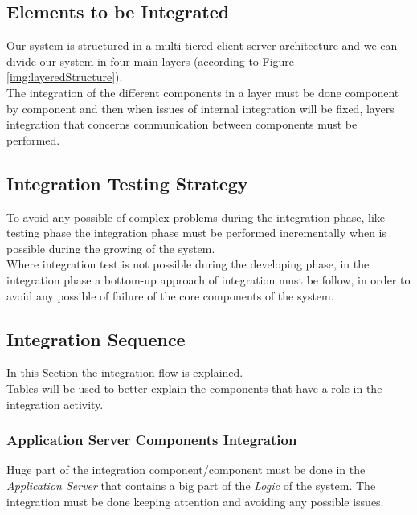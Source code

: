 \subsection{Elements to be Integrated}
Our system is structured in a multi-tiered client-server architecture and we can divide our system in four main layers (according to Figure \ref{img:layeredStructure}).\\
The integration of the different components in a layer must be done component by component and then when issues of internal integration will be fixed, layers integration that concerns communication between components must be performed.

\subsection{Integration Testing Strategy}
To avoid any possible of complex problems during the integration phase, like testing phase the integration phase must be performed incrementally when is possible during the growing of the system.\\
Where integration test is not possible during the developing phase, in the integration phase a bottom-up approach of integration must be follow, in order to avoid any possible of failure of the core components of the system.

\subsection{Integration Sequence}
In this Section the integration flow is explained.\\
Tables will be used to better explain the components that have a role in the integration activity.

\subsubsection{Application Server Components Integration}\label{appServCompIntRef}
Huge part of the integration component/component must be done in the \textit{Application Server} that contains a big part of the \textit{Logic} of the system. The integration must be done keeping attention and avoiding any possible issues.

